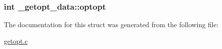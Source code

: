 \hypertarget{struct__getopt__data_a79cf014d8fd77e44eb896af422117bc9}{
\subsubsection[{optopt}]{\setlength{\rightskip}{0pt plus 5cm}int {\bf \-\_\-getopt\-\_\-data\-::optopt}}}\label{struct__getopt__data_a79cf014d8fd77e44eb896af422117bc9}


The documentation for this struct was generated from the following file\-:\begin{DoxyCompactItemize}
\item 
\hyperlink{getopt_8c}{getopt.\-c}\end{DoxyCompactItemize}
